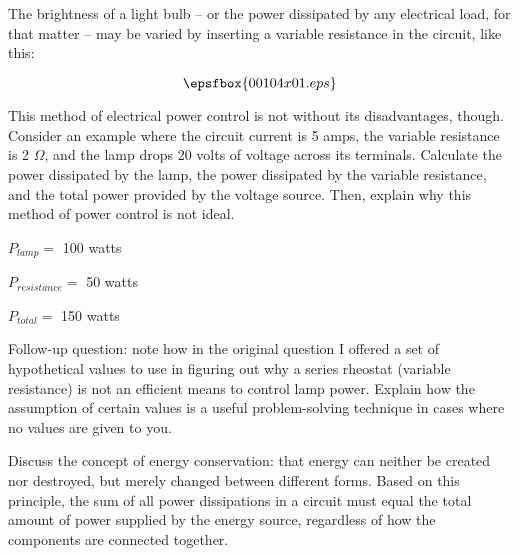 

The brightness of a light bulb -- or the power dissipated by any electrical load, for that matter -- may be varied by inserting a variable resistance in the circuit, like this:

$$\epsfbox{00104x01.eps}$$

This method of electrical power control is not without its disadvantages, though.  Consider an example where the circuit current is 5 amps, the variable resistance is 2 $\Omega$, and the lamp drops 20 volts of voltage across its terminals.  Calculate the power dissipated by the lamp, the power dissipated by the variable resistance, and the total power provided by the voltage source.  Then, explain why this method of power control is not ideal.







$P_{lamp} =$ 100 watts

$P_{resistance} =$ 50 watts

$P_{total} =$ 150 watts

\vskip 10pt

Follow-up question: note how in the original question I offered a set of hypothetical values to use in figuring out why a series rheostat (variable resistance) is not an efficient means to control lamp power.  Explain how the assumption of certain values is a useful problem-solving technique in cases where no values are given to you.







Discuss the concept of energy conservation: that energy can neither be created nor destroyed, but merely changed between different forms.  Based on this principle, the sum of all power dissipations in a circuit must equal the total amount of power supplied by the energy source, regardless of how the components are connected together.





